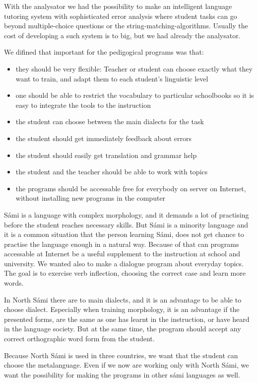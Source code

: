 \documentclass[a4paper,12pt]{article}
\begin{document}
With the analysator we had the possibility to make an intelligent language tutoring system with sophisticated error analysis where student tasks can go beyond multiple-choice questions or the string-matching-algorithms. Usually the cost of developing a such system is to big, but we had already the analysator.

We difined that important for the pedigogical programs was that:

\begin{itemize}
\item they should be very flexible: Teacher or student can choose exactly what they want to train, and adapt them to each student's linguistic level 
\item one should be able to restrict the vocabulary to particular schoolbooks so it is easy to integrate the tools to the instruction
\item the student can choose between the main dialects for the task
\item the student should get immediately feedback about errors
\item the student should easily get translation and grammar help
\item the student and the teacher should be able to work with topics 
\item the programs should be accessable free for everybody on server on Internet, without installing new programs in the computer
\end{itemize}

Sámi is a language with complex morphology, and it demands a lot of practising before the student reaches necessary skills. But Sámi is a minority language and it is a common situation that the person learning Sámi, does not get chance to practise the language enough in a natural way. Because of that can programs accessable at Internet be a useful supplement to the instruction at school and university. We wanted also to make a dialogue program about everyday topics. The goal is to exercise verb inflection, choosing the correct case and learn more words. 

In North Sámi there are to main dialects, and it is an advantage to be able to choose dialect. Especially when training morphology, it is an advantage if the presented forms, are the same as one has learnt in the instruction, or have heard in the language society. But at the same time, the program should accept 
any correct orthographic word form from the student.

Because North Sámi is used in three countries, we want that the student can choose the metalanguage. Even if we now are working only with North Sámi, we want the possibility for making the programs in other sámi languages as well.
\end{document}
